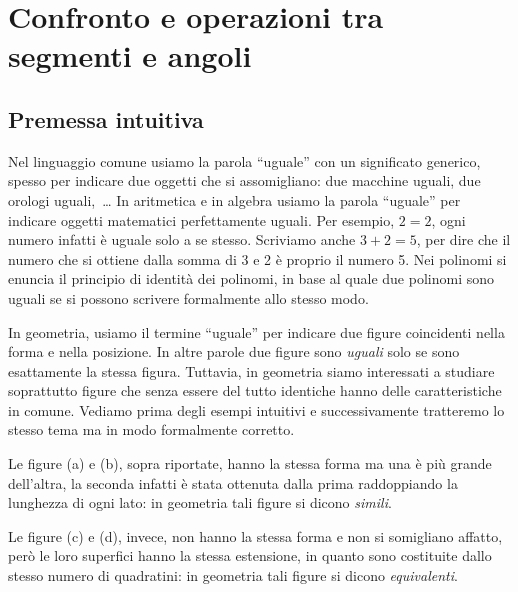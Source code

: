 \ovalbox{\ref{ese:1.64}, \ref{ese:1.65}}


\section{Confronto e operazioni tra segmenti e angoli}

\subsection{Premessa intuitiva}

Nel linguaggio comune usiamo la parola ``uguale'' con un significato generico, spesso per indicare due oggetti che si assomigliano: due macchine uguali, due orologi uguali,~\ldots{} In aritmetica e in algebra usiamo la parola ``uguale'' per indicare oggetti matematici perfettamente uguali. Per esempio, $2=2$, ogni numero infatti è uguale solo a se stesso. Scriviamo anche $3+2=5$, per dire che il numero che si ottiene dalla somma di 3 e 2 è proprio il numero 5. Nei polinomi si enuncia il principio di identità dei polinomi, in base al quale due polinomi sono uguali se si possono scrivere formalmente allo stesso modo.

In geometria, usiamo il termine ``uguale'' per indicare due figure coincidenti nella forma e nella posizione. In altre parole due figure sono \emph{uguali} solo se sono esattamente la stessa figura. Tuttavia, in geometria siamo interessati a studiare soprattutto figure che senza essere del tutto identiche hanno delle caratteristiche in comune. Vediamo prima degli esempi intuitivi e successivamente tratteremo lo stesso tema ma in modo formalmente corretto.

\begin{figure}[htb]
\centering\qquad\qquad

\end{figure}

Le figure (a) e (b), sopra riportate, hanno la stessa forma ma una è più grande dell'altra, la seconda infatti è stata ottenuta dalla prima raddoppiando la lunghezza di ogni lato: in geometria tali figure si dicono \emph{simili}.

Le figure (c) e (d), invece, non hanno la stessa forma e non si somigliano affatto, però le loro superfici hanno la stessa estensione, in quanto sono costituite dallo stesso numero di quadratini: in geometria tali figure si dicono \emph{equivalenti}.

\begin{figure}[htb]
\centering\qquad\qquad

\end{figure}

